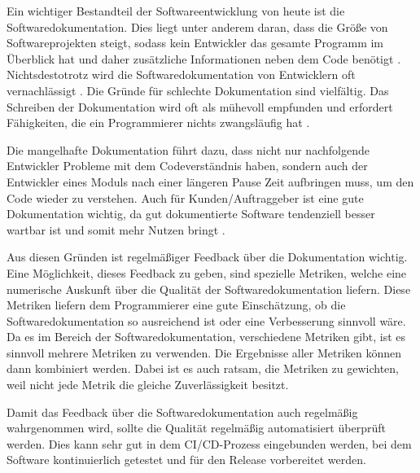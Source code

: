 \label{sec:introduction}

Ein wichtiger Bestandteil der Softwareentwicklung von heute ist die Softwaredokumentation. Dies liegt unter anderem daran, dass die Größe von Softwareprojekten steigt, sodass kein Entwickler das gesamte Programm im Überblick hat und daher zusätzliche Informationen neben dem Code benötigt \cite[S. 1]{StaticAnalysis:AnIntroduction:TheFundamentalChallengeofSoftwareEngineeringisOneofComplexity.}. Nichtsdestotrotz wird die Softwaredokumentation von Entwicklern oft vernachlässigt \cite[S. 83]{Qualityanalysisofsourcecodecomments}.  Die Gründe für schlechte Dokumentation sind vielfältig. Das Schreiben der Dokumentation wird oft als mühevoll empfunden und erfordert Fähigkeiten, die ein Programmierer nichts zwangsläufig hat\cite[S. 70]{AutomaticQualityAssessmentofSourceCodeComments:TheJavadocMiner} \cite[S. 593]{Softwareengineeringandsoftwaredocumentation:aunifiedlongcourse}.  

Die mangelhafte Dokumentation führt dazu, dass nicht nur nachfolgende Entwickler Probleme mit dem Codeverständnis haben, sondern auch der Entwickler eines Moduls nach einer längeren Pause Zeit aufbringen muss, um den Code wieder zu verstehen. Auch für Kunden/Auftraggeber ist eine gute Dokumentation wichtig, da gut dokumentierte Software tendenziell besser wartbar ist und somit mehr Nutzen bringt \cite[S. 83]{Qualityanalysisofsourcecodecomments}\cite[S. 1]{SoftwareDocumentationManagementIssuesandPractices:ASurvey}.

Aus diesen Gründen ist regelmäßiger Feedback über die Dokumentation wichtig. Eine Möglichkeit, dieses Feedback zu geben, sind spezielle Metriken, welche eine numerische Auskunft über die Qualität der Softwaredokumentation liefern. Diese Metriken liefern dem Programmierer eine gute Einschätzung, ob die Softwaredokumentation so ausreichend ist oder eine Verbesserung sinnvoll wäre. Da es im Bereich der Softwaredokumentation, verschiedene Metriken gibt, ist es sinnvoll mehrere Metriken zu verwenden. Die Ergebnisse aller Metriken können dann kombiniert werden. Dabei ist es auch ratsam, die Metriken zu gewichten, weil nicht jede Metrik die gleiche Zuverlässigkeit besitzt.

Damit das Feedback über die Softwaredokumentation auch regelmäßig wahrgenommen wird, sollte die Qualität regelmäßig automatisiert überprüft werden. Dies kann sehr gut in dem \ac{CI/CD}-Prozess eingebunden werden, bei dem Software kontinuierlich getestet und für den Release vorbereitet werden. 

